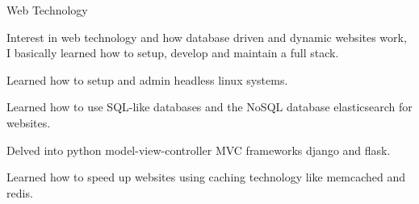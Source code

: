 \begin{cventries}
\cventry
  {} %
  {Web Technology} %
  {} %
  {} %
  {
    \begin{cvitems} %
      \item {Interest in web technology and how database driven and dynamic websites work, I basically learned how to setup, develop and maintain a full stack.}
      \item {Learned how to setup and admin headless linux systems.}
      \item {Learned how to use SQL-like databases and the NoSQL database elasticsearch for websites.}
      \item {Delved into python model-view-controller MVC frameworks django and flask.}
      \item {Learned how to speed up websites using caching technology like memcached and redis.}
    \end{cvitems}
  }


\end{cventries}
